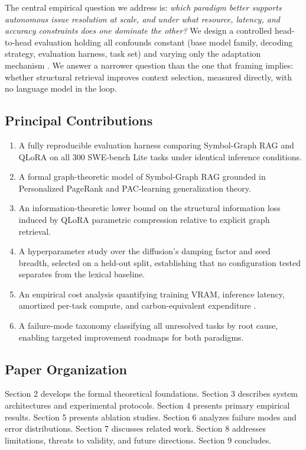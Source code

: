 \documentclass[10pt,journal,compsoc,twocolumn]{IEEEtran}
\begin{document}
The central empirical question we address is: \textit{which paradigm better supports autonomous issue resolution at scale, and under what resource, latency, and accuracy constraints does one dominate the other?} We design a controlled head-to-head evaluation holding all confounds constant (base model family, decoding strategy, evaluation harness, task set) and varying only the adaptation mechanism \cite{arxiv_2203_11171}. We answer a narrower question than the one that framing implies: whether structural retrieval improves context selection, measured directly, with no language model in the loop.


\subsection{Principal Contributions}


\begin{enumerate}
  \item A fully reproducible evaluation harness comparing Symbol-Graph RAG and QLoRA on all 300 SWE-bench Lite tasks under identical inference conditions.
  \item A formal graph-theoretic model of Symbol-Graph RAG grounded in Personalized PageRank and PAC-learning generalization theory.
  \item An information-theoretic lower bound on the structural information loss induced by QLoRA parametric compression relative to explicit graph retrieval.
  \item A hyperparameter study over the diffusion's damping factor and seed breadth, selected on a held-out split, establishing that no configuration tested separates from the lexical baseline.
  \item An empirical cost analysis quantifying training VRAM, inference latency, amortized per-task compute, and carbon-equivalent expenditure \cite{arxiv_2406_00584}.
  \item A failure-mode taxonomy classifying all unresolved tasks by root cause, enabling targeted improvement roadmaps for both paradigms.
\end{enumerate}


\subsection{Paper Organization}


Section 2 develops the formal theoretical foundations. Section 3 describes system architectures and experimental protocols. Section 4 presents primary empirical results. Section 5 presents ablation studies. Section 6 analyzes failure modes and error distributions. Section 7 discusses related work. Section 8 addresses limitations, threats to validity, and future directions. Section 9 concludes.
\end{document}
